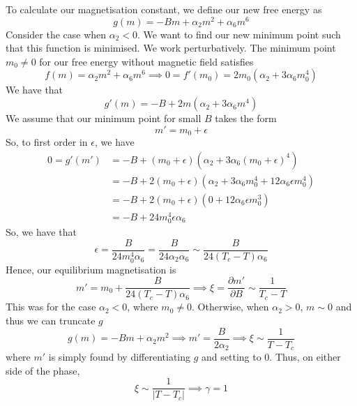 To calculate our magnetisation constant, we define our new free energy as 
\[
g ( m )   = - Bm + \alpha_2 m^ 2 + \alpha_6 m ^ 6 
\] Consider the case when $\alpha_2 < 0 $.  We want to find our new minimum point such that this function is minimised. 
We work perturbatively. The minimum point $ m_0  \neq 0 $ for our free energy 
without magnetic field satisfies 
\[
f ( m )  = \alpha_2 m ^ 2  +\alpha_6 m ^ 6 \implies 0  = f' ( m_0 ) =  2m_0 ( \alpha_2 + 3 \alpha_6 m_0 ^ 4 ) 
\] We have that 
\[
g '( m ) = - B + 2m ( \alpha_2 + 3 \alpha_6 m ^ 4 ) 
\] We assume that our minimum point for small $B $ takes the form 
\[
m' = m_0 + \epsilon 
\] So, to first order in $ \epsilon$, we have 
\begin{align*}
 0 = g' ( m' ) &=  - B + ( m_0 + \epsilon) ( \alpha_2 + 3 \alpha_6 ( m_0 + \epsilon) ^ 4 ) \\
	       & = - B + 2 ( m_0 + \epsilon)( \alpha_2 + 3 \alpha_6 m_0^ 4 + 12 \alpha_6 \epsilon m_0^ 4) \\
	       &= - B + 2 ( m_0 + \epsilon) ( 0 + 12 \alpha_6 \epsilon m_0^3 ) \\
	       &= - B + 24 m_0^4 \epsilon \alpha_6 
	  \end{align*}
So, we have that 
\[
	\epsilon = \frac{B }{ 24 m_0^4 \alpha_6 } = \frac{B }{ 24 \alpha_2 \alpha_6} \sim \frac{B }{ 24 ( T_c - T )  \alpha_6} 
\] Hence, our equilibrium magnetisation is
\[
 m ' = m_0 +  \frac{B }{ 24 ( T_c - T )  \alpha_6} \implies  \xi =\frac{\partial m' }{\partial B } \sim \frac{1}{T_c - T }
\] This was for the case $ \alpha_2 < 0 $, where $ m_0 \neq 0 $. 
Otherwise, when $\alpha_2 > 0 $, $m \sim 0 $ and thus we can truncate $ g $
 \[
 g ( m) = - B m + \alpha_2 m^2 \implies m' = \frac{B}{2 \alpha_2 } \implies \xi  \sim \frac{1}{ T - T_c}
\] where $ m' $ is simply found by differentiating $g $ and setting to 0. 
Thus, on either side of the phase, 
\[
\xi \sim \frac{1}{ | T - T_c | } \implies \gamma = 1
\] 


\pagebreak 
